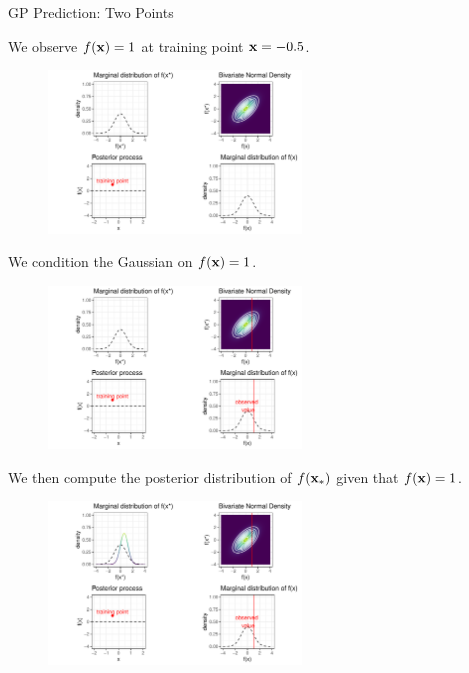 \begin{frame}[c,allowframebreaks]{GP Prediction: Two Points}
\framebreak

We observe $f(\mathbf{x}) = 1$ at training point $\mathbf{x} = -0.5$. 


\begin{figure}
\includegraphics[width=0.6\textwidth]{figure/gp-posterior-2-1.pdf}\par
\end{figure}


\framebreak

We condition the Gaussian on $f(\mathbf{x}) = 1$. 


\begin{figure}
\includegraphics[width=0.6\textwidth]{figure/gp-posterior-3-1.pdf}\par
\end{figure}

\framebreak

We then compute the posterior distribution of $f(\mathbf{x}_*)$ given that $f(\mathbf{x}) = 1$.


\begin{figure}
\includegraphics[width=0.6\textwidth]{figure/gp-posterior-5-1.pdf}\par
\end{figure}



\end{frame}
